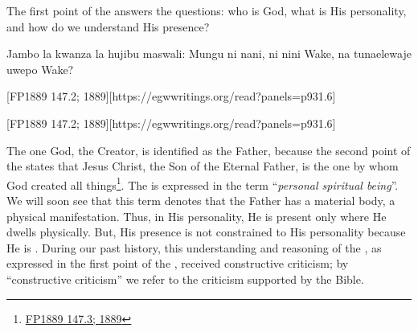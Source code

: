 



The first point of the  answers the questions: who is God, what is His personality, and how do we understand His presence?


Jambo la kwanza la  hujibu maswali: Mungu ni nani, ni nini  Wake, na tunaelewaje uwepo Wake?


[FP1889 147.2; 1889][https://egwwritings.org/read?panels=p931.6]


[FP1889 147.2; 1889][https://egwwritings.org/read?panels=p931.6]


The one God, the Creator, is identified as the Father, because the second point of the  states that Jesus Christ, the Son of the Eternal Father, is the one by whom God created all things\footnote{\href{https://egwwritings.org/?ref=en_FP1889.147.3&para=931.7}{FP1889 147.3; 1889}}. The  is expressed in the term “\textit{personal spiritual being}”. We will soon see that this term denotes that the Father has a material body, a physical manifestation. Thus, in His personality, He is present only where He dwells physically. But, His presence is not constrained to His personality because He is . During our past history, this understanding and reasoning of the , as expressed in the first point of the , received constructive criticism; by “constructive criticism” we refer to the criticism supported by the Bible.


